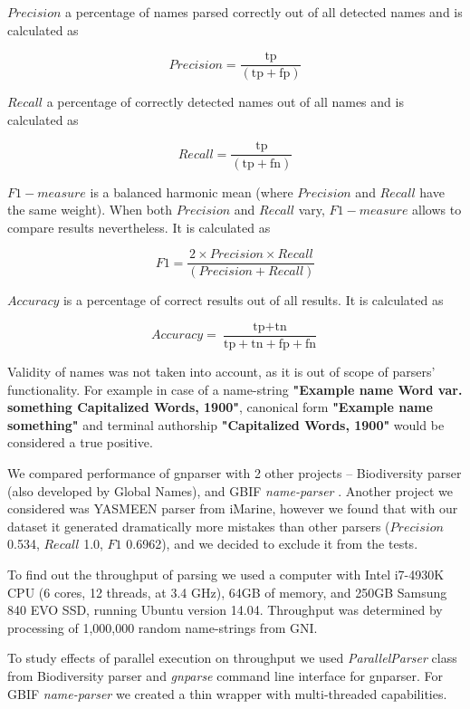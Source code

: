 \documentclass{bmcart}
\begin{document}
$Precision$ a percentage of names parsed correctly out of all detected names
and is calculated as

\[Precision = \dfrac{\text{tp}}{(\text{tp} + \text{fp})}\]

$Recall$ a percentage of correctly detected names out of all names and is
calculated as

\[Recall = \dfrac{\text{tp}}{(\text{tp} + \text{fn})}\]

$F1-measure$ is a balanced harmonic mean (where $Precision$ and $Recall$ have
the same weight). When both $Precision$ and $Recall$ vary, $F1-measure$ allows
to compare results nevertheless. It is calculated as

\[F1 = \dfrac{2 \times Precision \times Recall}{(Precision + Recall)}\]

$Accuracy$ is a percentage of correct results out of all results. It is
calculated as

\[Accuracy = \dfrac{\text{tp} + \text{tn}}
  {\text{tp} + \text{tn} + \text{fp} + \text{fn}}\]

Validity of names was not taken into account, as it is out of scope of
parsers' functionality. For example in case of a name-string \textbf{"Example
name Word var.  something Capitalized Words, 1900"}, canonical form
\textbf{"Example name something"} and terminal authorship \textbf{"Capitalized
Words, 1900"} would be considered a true positive.

We compared performance of gnparser with 2 other projects -- Biodiversity
parser\cite{biodiversity} (also developed by Global Names), and GBIF
\textit{name-parser} \cite{gbifNameParser}. Another project we considered was
YASMEEN parser from iMarine\cite{VandenBerghe2015}, however we found that with
our dataset it generated dramatically more mistakes than other parsers
($Precision$ 0.534, $Recall$ 1.0, $F1$ 0.6962), and we decided to exclude it
from the tests.

To find out the throughput of parsing we used a computer with Intel i7-4930K
CPU (6 cores, 12 threads, at 3.4 GHz), 64GB of memory, and 250GB Samsung 840
EVO SSD, running Ubuntu version 14.04. Throughput was determined by processing
of 1,000,000 random name-strings from GNI.

To study effects of parallel execution on throughput we used
\textit{ParallelParser} class from Biodiversity parser and \textit{gnparse}
command line interface for gnparser. For GBIF \textit{name-parser} we created a
thin wrapper with multi-threaded capabilities\cite{gbifparser}.
\end{document}
